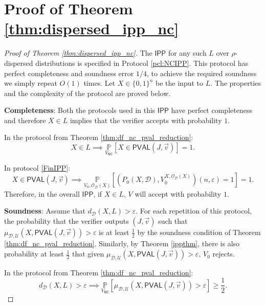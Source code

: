\documentclass[10pt,a4paper]{article}
\newcommand{\NC}{\mathsf{NC}}
\newcommand{\PVAL}{\mathsf{PVAL}}
\newcommand{\IPP}{\mathsf{IPP}}
\newcommand{\sD}{\mathcal{D}}
\begin{document}
\section{Proof of Theorem \ref{thm:dispersed_ipp_nc}}
\label{sec:dispersed_ipp_nc}
\begin{proof}[Proof of Theorem \ref{thm:dispersed_ipp_nc}]
The $\IPP$ for any such $L$ over $\rho$-dispersed distributions is specified in Protocol \ref{pcl:NCIPP}. This protocol has perfect completeness and soundness error $1/4$, to achieve the required soundness we simply repeat $O(1)$ times. Let $X \in \{0,1\}^n$ be the input to $L$. The properties and the complexity of the protocol are proved below.

\vspace{0.1in}
\textbf{Completeness}: Both the protocols used in this $\IPP$ have perfect completeness and therefore $X\in L$ implies that the verifier accepts with probability $1$.

In the protocol from Theorem \ref{thm:df_nc_pval_reduction}:
\begin{equation*}
    X\in L\implies \underset{V_{\NC}}{\mathbb{P}}[X\in \PVAL(J,\Vec{v})]=1.
\end{equation*}

In protocol \ref{FinIPP}:
\begin{equation*}
    X\in \PVAL(J,\Vec{v})\implies \underset{V_{0},\mathcal{O}_{\mathcal{D}}(X)}{\mathbb{P}}\left[(P_{0}(X,\sD),V_{0}^{X,\mathcal{O}_{\sD}(X)})(n,\varepsilon)=1\right]=1.
\end{equation*}
Therefore, in the overall $\IPP$, if $X\in L$, $V$ will accept with probability $1$.

\textbf{Soundness}: Assume that $d_{\mathcal{D}}(X,L)>\varepsilon$. For each repetition of this protocol, the probability that the verifier outputs $(J,\Vec{v})$ such that $\mu_{\mathcal{D},\mathcal{U}}(X,\PVAL(J,\Vec{v}))>\varepsilon$ is at least $\frac{1}{2}$ by the soundness condition of Theorem \ref{thm:df_nc_pval_reduction}. Similarly, by Theorem \ref{ippthm}, there is also probability at least $\frac{1}{2}$ that given $\mu_{\mathcal{D},\mathcal{U}}(X,\PVAL(J,\Vec{v}))>\varepsilon$, $V_{0}$ rejects. 

In the protocol from Theorem \ref{thm:df_nc_pval_reduction}:
\begin{equation*}
    d_{\sD}(X,L)>\varepsilon \implies \underset{{V_{\NC}}}{\mathbb{P}}[\mu_{\sD,\mathcal{U}}(X, \PVAL(J,\Vec{v}))>\varepsilon]\geq \frac{1}{2}.
\end{equation*}


\end{proof}
\end{document}
